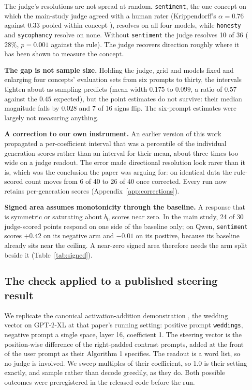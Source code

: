 \documentclass{article}
\begin{document}
The judge's resolutions are not spread at random. \texttt{sentiment}, the one
concept on which the main-study judge agreed with a human rater (Krippendorff's
$\alpha = 0.76$ against $0.33$ pooled within concept
\citep{krippendorff2019content}), resolves on all four models, while
\texttt{honesty} and \texttt{sycophancy} resolve on none. Without
\texttt{sentiment} the judge resolves 10 of 36 ($28\%$, $p=0.001$ against the
rule). The judge recovers direction roughly where it has been shown to measure
the concept.

\textbf{The gap is not sample size.} Holding the judge, grid and models fixed and
enlarging four concepts' evaluation sets from six prompts to thirty, the
intervals tighten about as sampling predicts (mean width $0.175$ to $0.099$, a
ratio of $0.57$ against the $0.45$ expected), but the point estimates do not
survive: their median magnitude falls by $0.028$ and 7 of 16 signs flip. The
six-prompt estimates were largely not measuring anything.

\textbf{A correction to our own instrument.} An earlier version of this work
propagated a per-coefficient interval that was a percentile of the individual
generation scores rather than an interval for their mean, about three times too
wide on a judge readout. The error made directional resolution look rarer than
it is, which was the conclusion the paper was arguing for: on identical data the
rule-scored count moves from 6 of 40 to 26 of 40 once corrected. Every run now
retains per-generation scores (Appendix~\ref{app:corrections}).

\textbf{Signed area assumes monotonicity through the baseline.} A response that
is symmetric or saturating about $b_0$ scores near zero. In the main study, 24
of 30 judge-scored points respond on one side of the baseline only; on Qwen,
\texttt{sentiment} scores $+0.42$ on its negative arm and $-0.01$ on its
positive, because its baseline already sits near the ceiling. A near-zero signed
area therefore needs the arm split beside it (Table~\ref{tab:signed}).

\subsection{The check applied to a published steering result}
\label{sec:published}

We replicate the canonical activation-addition demonstration
\citep{turner2023actadd}, the wedding vector on GPT-2-XL at that paper's running
setting: positive prompt \texttt{weddings}, negative prompt a single space, layer
16, coefficient 1. The steering vector is the position-wise difference of the
right-padded contrast prompts, added at the front of the user prompt as their
Algorithm 1 specifies. The readout is a word list, so no judge is involved. We
sweep multiples of their coefficient, so $1.0$ is their setting exactly, and
sample rather than decode greedily, as they do. Both possible outcomes were
preregistered in the released code before the run.
\end{document}
